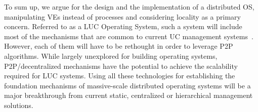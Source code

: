To sum up,  we argue for the design and the implementation of a distributed OS,
manipulating VEs instead of processes and considering locality as a primary concern. 
Referred to as a LUC Operating System, such
a system will include most of the mechanisms that are common to current UC
management systems~\cite{cloudstack,nimbus,opennebula,openstack,lowe:wiley11,moreno:2012}.  However,
each of them will have to be rethought in order to leverage P2P algorithms.
%
While largely unexplored for building operating systems,
P2P/decentralized mechanisms have the potential to achieve the scalability required
for LUC systems.
Using all these technologies for establishing the foundation mechanisms of
massive-scale distributed operating systems will be a major breakthrough from
current static, centralized or hierarchical management solutions.

%
